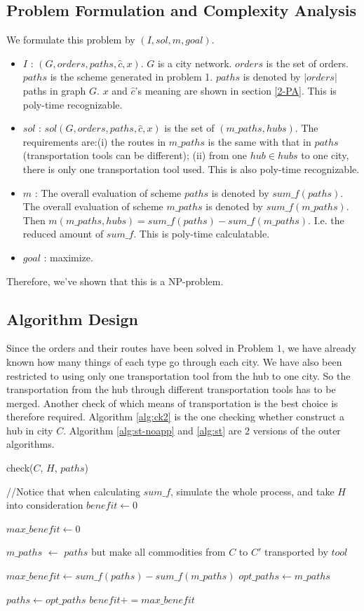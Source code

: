 \documentclass[11pt, a4paper]{article} %
\begin{document}
	\subsection{Problem Formulation and Complexity Analysis}
	We formulate this problem by $(I,sol,m,goal)$.
	\begin{itemize}
		\item $I$ : $(G,orders,paths,\hat{c},x)$. $G$ is a city network. $orders$ is the set of orders. $paths$ is the scheme generated in problem 1. $paths$ is denoted by $|orders|$ paths in graph $G$. $x$ and $\hat{c}$'s meaning are shown in section \ref{2-PA}. This is poly-time recognizable.
		\item $sol$ : $sol(G,orders,paths,\hat{c},x)$ is the set of $(m\_paths,hubs)$. The requirements are:(i) the routes in $m\_paths$ is the same with that in $paths$ (transportation tools can be different); (ii) from one $hub\in hubs$ to one city, there is only one transportation tool used. This is also poly-time recognizable.
		\item $m$ : The overall evaluation of scheme $paths$ is denoted by $sum\_f(paths)$. The overall evaluation of scheme $m\_paths$ is denoted by $sum\_f(m\_paths)$. Then $m(m\_paths, hubs) = sum\_f(paths)-sum\_f(m\_paths)$. I.e. the reduced amount of $sum\_f$. This is poly-time calculatable.
		\item $goal$ : maximize.
	\end{itemize}
	Therefore, we've shown that this is a NP-problem.
	\subsection{Algorithm Design}
	Since the orders and their routes have been solved in Problem $1$, we have already known how many things of each type go through each city. We have also been restricted to using only one transportation tool from the hub to one city. So the transportation from the hub through different transportation tools has to be merged. Another check of which means of transportation is the best choice is therefore required. Algorithm \ref{alg:ck2} is the one checking whether construct a hub in city $C$. Algorithm \ref{alg:st-noapp} and \ref{alg:st} are 2 versions of the outer algorithms.
	
	\begin{algorithm}\label{alg:ck2}
		\caption{check($C$, $H$, $paths$)}
		\BlankLine
		//Notice that when calculating $sum\_f$, simulate the whole process, and take $H$ into consideration\;
		$benefit\leftarrow 0$\;
		{
			$max\_benefit\leftarrow 0$\;
			{
				$m\_paths$ $\leftarrow$ $paths$ but make all commodities from $C$ to $C'$ transported by $tool$\;
				{
					
					$max\_benefit\leftarrow sum\_f(paths)-sum\_f(m\_paths)$\;
					$opt\_paths\leftarrow m\_paths$\;
				}
			}
			$paths\leftarrow opt\_paths$\;
			$benefit+=max\_benefit$\;
		}
		\;
	\end{algorithm}
	
\end{document}
